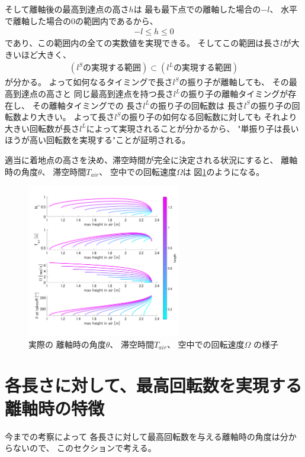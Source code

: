 \documentclass[a4paper,11pt]{jsarticle}
\begin{document}
そして離軸後の最高到達点の高さ$h$は
最も最下点での離軸した場合の$-l$、
水平で離軸した場合の$0$の範囲内であるから、
\begin{align}
  -l \leq h \leq 0
\end{align}
であり、この範囲内の全ての実数値を実現できる。
そしてこの範囲は長さ$l$が大きいほど大きく、
\begin{align}
  (l^S\textrm{の実現する範囲}) \subset (l^L\textrm{の実現する範囲})
\end{align}
が分かる。
よって如何なるタイミングで長さ$l^S$の振り子が離軸しても、
その最高到達点の高さと
同じ最高到達点を持つ長さ$l^L$の振り子の離軸タイミングが存在し、
その離軸タイミングでの
長さ$l^L$の振り子の回転数は
長さ$l^S$の振り子の回転数より大きい。
よって長さ$l^S$の振り子の如何なる回転数に対しても
それより大きい回転数が長さ$l^L$によって実現されることが分かるから、
"単振り子は長いほうが高い回転数を実現する"ことが証明される。


適当に着地点の高さを決め、滞空時間が完全に決定される状況にすると、
離軸時の角度$\theta$、
滞空時間$T_{air}$、
空中での回転速度$\Omega$は
図\ref{result.png}のようになる。
\begin{figure}[h]
  \centering
  \includegraphics[width = 0.6\textwidth]{result.png}
  \caption{
    実際の
    離軸時の角度$\theta$、
    滞空時間$T_{air}$、
    空中での回転速度$\Omega$
    の様子
    }
  \label{result.png}
\end{figure}

\section{各長さに対して、最高回転数を実現する離軸時の特徴}

今までの考察によって
各長さに対して最高回転数を与える離軸時の角度は分からないので、
このセクションで考える。
\end{document}

